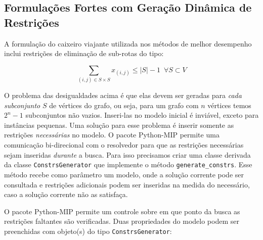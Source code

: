\documentclass[a4paper,11pt,fleqn]{article}
\begin{document}
\subsection{Formulações Fortes com Geração Dinâmica de Restrições}

A formulação do caixeiro viajante utilizada nos métodos de melhor desempenho inclui restrições de eliminação de sub-rotas do tipo:

\begin{equation}
	\sum_{(i,j) \in S \times S} x_{(i,j)} \leq |S|-1 \,\,\, \forall S \subset V \label{consSubTour}
\end{equation}

O problema das desigualdades acima é que elas devem ser geradas para \emph{cada subconjunto} $S$ de vértices do grafo, ou seja, para um grafo com $n$ vértices temos $2^n-1$ subconjuntos não vazios. 
Inseri-las no modelo inicial é inviável, exceto para instâncias pequenas. 
Uma solução para esse problema é inserir somente as restrições \emph{necessárias} no modelo. 
O pacote Python-MIP permite uma comunicação bi-direcional com o resolvedor para que as restrições necessárias sejam inseridas \emph{durante} a busca. 
Para isso precisamos criar uma classe derivada da classe \texttt{ConstrsGenerator} que implemente o método \texttt{generate\_constrs}. 
Esse método recebe como parâmetro um modelo, onde a solução corrente pode ser consultada e restrições adicionais podem ser inseridas na medida do necessário, caso a solução corrente não as satisfaça. 

O pacote Python-MIP permite um controle sobre em que ponto da busca as restrições faltantes são verificadas. 
Duas propriedades do modelo podem ser preenchidas com objeto(s) do tipo \texttt{ConstrsGenerator}:
\end{document}
